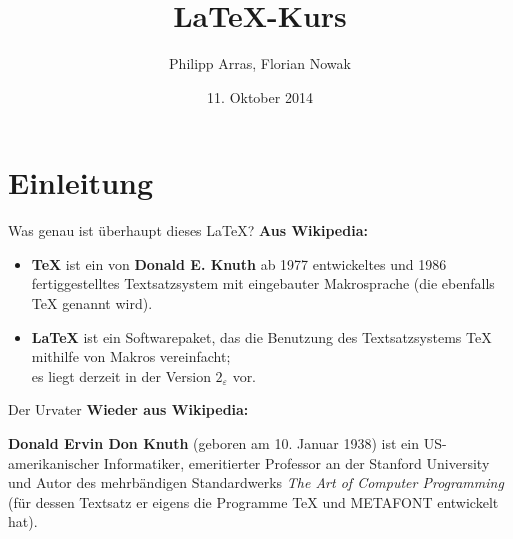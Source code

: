 \documentclass[11pt]{beamer}
\author{Philipp Arras, Florian Nowak}
\title{\LaTeX -Kurs}
\date{11. Oktober 2014}
\begin{document}


\section{Einleitung}
\begin{frame}{Was genau ist überhaupt dieses {\LaTeX}?}
\textbf{Aus Wikipedia:}

\smallskip
\begin{itemize}
\item \textbf{\TeX} ist ein von \textbf{Donald E. Knuth} ab 1977 entwickeltes und 1986 fertiggestelltes Textsatzsystem mit eingebauter Makrosprache (die ebenfalls {\TeX} genannt wird).
\item \textbf{\LaTeX} ist ein Softwarepaket, das die Benutzung des Textsatzsystems {\TeX} mithilfe von Makros vereinfacht;\\
es liegt derzeit in der Version $2_\varepsilon$ vor.
\end{itemize}
\end{frame}

\begin{frame}{Der Urvater}
\textbf{Wieder aus Wikipedia:}

\medskip\noindent
\textbf{Donald Ervin {\glqq}Don{\grqq} Knuth} (geboren am 10. Januar 1938) ist ein US-amerikanischer Informatiker, emeritierter Professor an der Stanford University und Autor des mehrbändigen Standardwerks \textit{The Art of Computer Programming} (für dessen Textsatz er eigens die Programme {\TeX} und METAFONT entwickelt hat). 
\end{frame}
\end{document}
